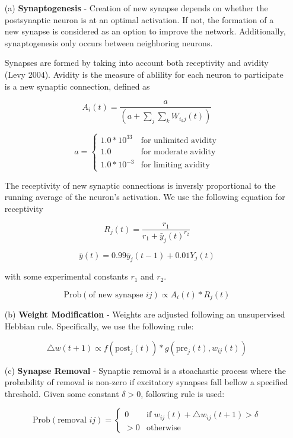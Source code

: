 \documentclass[journal]{./sty/IEEEtran}
\begin{document}
\begin{itemize}
\item[(a)] {\bf Synaptogenesis} - 
Creation of new synapse depends on whether the postsynaptic neuron is at an optimal activation. If not, the formation of a new synapse is considered as an option to improve the network. Additionally, synaptogenesis only occurs between neighboring neurons. 

Synapses are formed by taking into account both receptivity and avidity (Levy 2004). Avidity is the measure of ablility for each neuron to participate is a new synaptic connection, defined as

\[
A_i(t)=\frac{a}{(a + \sum_j\sum_kW_{i_kj}(t))}
\]

\[
a = \left\{
\begin{array}{lr}
  1.0 * 10^{33} & \text{for unlimited avidity}\\
  1.0 & \text{for moderate avidity}\\
  1.0 * 10^{-3} & \text{for limiting avidity}
\end{array}
\right.
\]

The receptivity of new synaptic connections is inversly proportional to the running average of the neuron's activation. We use the following equation for receptivity 

\[
R_j(t) = \frac{r_1}{r_1 + \bar{y}_j(t)^{r_2}}
\]

\[
\bar{y}(t) = 0.99 \bar{y}_j(t-1) + 0.01 Y_j(t)
\]

with some experimental constants \(r_1\) and \(r_2\).

\[
\text{Prob}(\text{of new synapse } ij ) \propto A_i(t) * R_j(t)
\]

\item[(b)] {\bf Weight Modification} - 
Weights are adjusted following an unsupervised Hebbian rule. Specifically, we use the following rule:

\[
\triangle w(t+1) \propto f(\text{post}_j(t))*g(\text{pre}_j(t), w_{ij}(t))
\]

\item[(c)] {\bf Synapse Removal} -
Synaptic removal is a stoachastic process where the probability of removal is non-zero if excitatory synapses fall bellow a specified threshold. Given some constant \(\delta > 0\), following rule is used:

\[
\text{Prob}(\text{removal } ij) = \left\{
     \begin{array}{lr}
       0 & \text{if } w_{ij}(t) + \triangle w_{ij}(t+1) > \delta\\
       >0 & \text{otherwise}
     \end{array}
   \right.
\]

\end{itemize}
\end{document}
